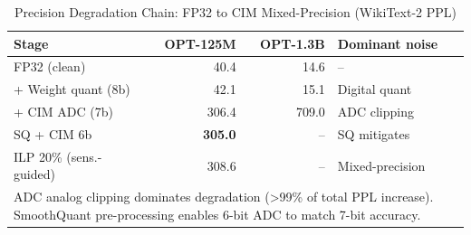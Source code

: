 \begin{table}[t]
\centering
\caption{Precision Degradation Chain: FP32 to CIM Mixed-Precision (WikiText-2 PPL)}
\label{tab:degradation}
\begin{tabular}{lrrl}
\toprule
Stage & OPT-125M & OPT-1.3B & Dominant noise \\
\midrule
FP32 (clean)              & 40.4  & 14.6  & -- \\
+ Weight quant (8b)       & 42.1  & 15.1  & Digital quant \\
+ CIM ADC (7b)            & 306.4 & 709.0 & ADC clipping \\
\midrule
SQ + CIM 6b              & \textbf{305.0} & --    & SQ mitigates \\
ILP 20\% (sens.-guided)  & 308.6 & --    & Mixed-precision \\
\bottomrule
\multicolumn{4}{p{0.85\columnwidth}}{\small ADC analog clipping dominates degradation (>99\% of total PPL increase). SmoothQuant pre-processing enables 6-bit ADC to match 7-bit accuracy.}\\
\end{tabular}
\end{table}
